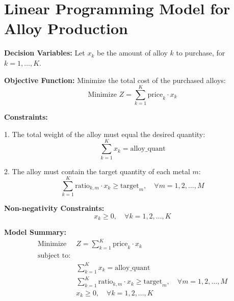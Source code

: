 \documentclass{article}
\begin{document}
\section*{Linear Programming Model for Alloy Production}

\textbf{Decision Variables:}
Let \( x_k \) be the amount of alloy \( k \) to purchase, for \( k = 1, \ldots, K \).

\textbf{Objective Function:}
Minimize the total cost of the purchased alloys:
\[
\text{Minimize } Z = \sum_{k=1}^{K} \text{price}_k \cdot x_k
\]

\textbf{Constraints:}

1. The total weight of the alloy must equal the desired quantity:
\[
\sum_{k=1}^{K} x_k = \text{alloy\_quant}
\]

2. The alloy must contain the target quantity of each metal \( m \):
\[
\sum_{k=1}^{K} \text{ratio}_{k,m} \cdot x_k \geq \text{target}_m, \quad \forall m = 1, 2, \ldots, M
\]

\textbf{Non-negativity Constraints:}
\[
x_k \geq 0, \quad \forall k = 1, 2, \ldots, K
\]

\textbf{Model Summary:}
\begin{align*}
\text{Minimize } & Z = \sum_{k=1}^{K} \text{price}_k \cdot x_k \\
\text{subject to:} & \\
& \sum_{k=1}^{K} x_k = \text{alloy\_quant} \\
& \sum_{k=1}^{K} \text{ratio}_{k,m} \cdot x_k \geq \text{target}_m, \quad \forall m = 1, 2, \ldots, M \\
& x_k \geq 0, \quad \forall k = 1, 2, \ldots, K
\end{align*}
\end{document}

